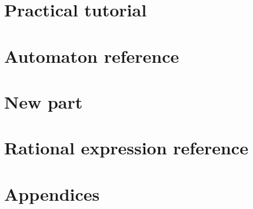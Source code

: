 








\tableofcontents

\mainmatter
{}

\part{Practical tutorial}

%





\part{Automaton reference}













\part{New part}



\part{Rational expression reference}




\part{Appendices}




